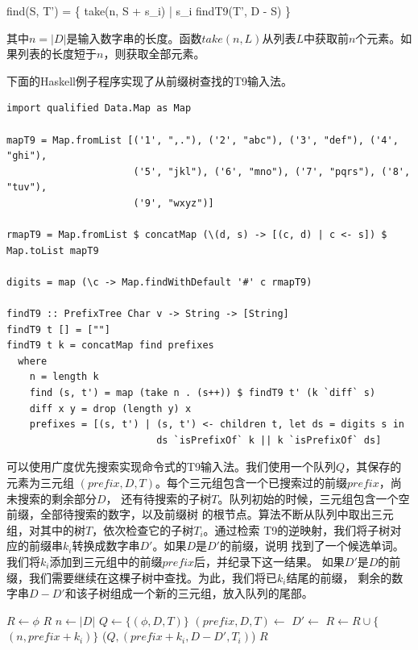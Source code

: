 \documentclass[b5paper]{ctexart}
\begin{document}
\be
find(S, T') = \{ take(n, S + s_i) | s_i \in findT9(T', D - S) \}
\ee

其中$n = |D|$是输入数字串的长度。函数$take(n, L)$从列表$L$中获取前$n$个元素。如果列表的长度短于$n$，则获取全部元素。

下面的Haskell例子程序实现了从前缀树查找的T9输入法。

\lstset{language=Haskell}
\begin{lstlisting}
import qualified Data.Map as Map

mapT9 = Map.fromList [('1', ",."), ('2', "abc"), ('3', "def"), ('4', "ghi"),
                      ('5', "jkl"), ('6', "mno"), ('7', "pqrs"), ('8', "tuv"),
                      ('9', "wxyz")]

rmapT9 = Map.fromList $ concatMap (\(d, s) -> [(c, d) | c <- s]) $ Map.toList mapT9

digits = map (\c -> Map.findWithDefault '#' c rmapT9)

findT9 :: PrefixTree Char v -> String -> [String]
findT9 t [] = [""]
findT9 t k = concatMap find prefixes
  where
    n = length k
    find (s, t') = map (take n . (s++)) $ findT9 t' (k `diff` s)
    diff x y = drop (length y) x
    prefixes = [(s, t') | (s, t') <- children t, let ds = digits s in
                          ds `isPrefixOf` k || k `isPrefixOf` ds]
\end{lstlisting}  %

可以使用广度优先搜索实现命令式的T9输入法。我们使用一个队列$Q$，其保存的元素为三元组
$(prefix, D, T)$。每个三元组包含一个已搜索过的前缀$prefix$，尚未搜索的剩余部分$D$，
还有待搜索的子树$T$。队列初始的时候，三元组包含一个空前缀，全部待搜索的数字，以及前缀树
的根节点。算法不断从队列中取出三元组，对其中的树$T$，依次检查它的子树$T_i$。通过检索
T9的逆映射，我们将子树对应的前缀串$k_i$转换成数字串$D'$。如果$D$是$D'$的前缀，说明
找到了一个候选单词。我们将$k_i$添加到三元组中的前缀$prefix$后，并纪录下这一结果。
如果$D'$是$D$的前缀，我们需要继续在这棵子树中查找。为此，我们将已$k_i$结尾的前缀，
剩余的数字串$D-D'$和该子树组成一个新的三元组，放入队列的尾部。

\begin{algorithmic}[1]
  \State $R \gets \phi$
    \State \Return $R$
  \EndIf
  \State $n \gets |D|$
  \State $Q \gets \{(\phi, D, T)\}$
    \State $(prefix, D, T) \gets$ 
      \State $D' \gets$ 
       
        \State $R \gets R \cup \{$  $(n, prefix + k_i) \}$ 
        \State {}($Q, (prefix + k_i, D - D', T_i)$)
      \EndIf
    \EndFor
  \EndWhile
  \State \Return $R$
\EndFunction
\end{algorithmic}
\end{document}

